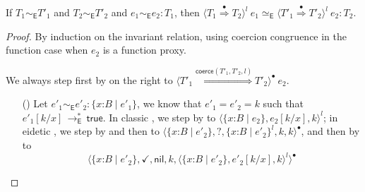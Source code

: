 \documentclass[9pt]{extarticle}
\newcommand{\ottnt}[1]{\mathit{#1}}
\newcommand{\ottsym}[1]{#1}
\begin{document}
\begin{lemma}
  \label{lem:eideticlrcast}
  If $ \ottnt{T_{{\mathrm{1}}}}   \sim _{  \mathsf{E}  }  \ottnt{T'_{{\mathrm{1}}}} $ and $ \ottnt{T_{{\mathrm{2}}}}   \sim _{  \mathsf{E}  }  \ottnt{T'_{{\mathrm{2}}}} $ and $ \ottnt{e_{{\mathrm{1}}}}   \sim _{  \mathsf{E}  }  \ottnt{e_{{\mathrm{2}}}}  :  \ottnt{T_{{\mathrm{1}}}} $, then
  $  \langle  \ottnt{T_{{\mathrm{1}}}}  \mathord{ \overset{\bullet}{\Rightarrow} }  \ottnt{T_{{\mathrm{2}}}}  \rangle^{ \ottnt{l} } ~  \ottnt{e_{{\mathrm{1}}}}    \simeq _{  \mathsf{E}  }   \langle  \ottnt{T'_{{\mathrm{1}}}}  \mathord{ \overset{\bullet}{\Rightarrow} }  \ottnt{T'_{{\mathrm{2}}}}  \rangle^{ \ottnt{l} } ~  \ottnt{e_{{\mathrm{2}}}}   :  \ottnt{T_{{\mathrm{2}}}} $.
\begin{proof}
    By induction on the invariant relation, using coercion congruence
    in the function case when $\ottnt{e_{{\mathrm{2}}}}$ is a function proxy.
{\iffull We always step first by  on the right to
      $ \langle  \ottnt{T'_{{\mathrm{1}}}}  \mathord{ \overset{  \mathsf{coerce} ( \ottnt{T'_{{\mathrm{1}}}} , \ottnt{T'_{{\mathrm{2}}}} , \ottnt{l} )  }{\Rightarrow} }  \ottnt{T'_{{\mathrm{2}}}}  \rangle^{\bullet} ~  \ottnt{e_{{\mathrm{2}}}} $.
\begin{itemize}
    \item[(\A{Refine})] Let $ \ottnt{e'_{{\mathrm{1}}}}   \sim _{  \mathsf{E}  }  \ottnt{e'_{{\mathrm{2}}}}  :   \{ \mathit{x} \mathord{:} \ottnt{B} \mathrel{\mid} \ottnt{e'_{{\mathrm{1}}}} \}  $, we
      know that $\ottnt{e'_{{\mathrm{1}}}}  \ottsym{=}  \ottnt{e'_{{\mathrm{2}}}} = \ottnt{k}$ such that $ \ottnt{e'_{{\mathrm{1}}}}  [  \ottnt{k} / \mathit{x}  ]  \,  \longrightarrow ^{*}_{  \mathsf{E}  }  \,  \mathsf{true} $.
In classic \lambdah, we step by  to
      $ \langle   \{ \mathit{x} \mathord{:} \ottnt{B} \mathrel{\mid} \ottnt{e_{{\mathrm{2}}}} \}  ,   \ottnt{e_{{\mathrm{2}}}}  [  \ottnt{k} / \mathit{x}  ]  ,  \ottnt{k}  \rangle^{ \ottnt{l} } $; in eidetic \lambdah, we step by
       and then  to
      $ \langle   \{ \mathit{x} \mathord{:} \ottnt{B} \mathrel{\mid} \ottnt{e'_{{\mathrm{2}}}} \}  ,   \mathord{?}  ,   \{ \mathit{x} \mathord{:} \ottnt{B} \mathrel{\mid} \ottnt{e'_{{\mathrm{2}}}} \}^{ \ottnt{l} }  ,  \ottnt{k} ,  \ottnt{k}  \rangle^{\bullet} $, and then by  to 
      \[  \langle   \{ \mathit{x} \mathord{:} \ottnt{B} \mathrel{\mid} \ottnt{e'_{{\mathrm{2}}}} \}  ,   \mathord{\checkmark}  ,  \mathsf{nil} ,  \ottnt{k} ,   \langle   \{ \mathit{x} \mathord{:} \ottnt{B} \mathrel{\mid} \ottnt{e'_{{\mathrm{2}}}} \}  ,   \ottnt{e'_{{\mathrm{2}}}}  [  \ottnt{k} / \mathit{x}  ]  ,  \ottnt{k}  \rangle^{ \ottnt{l} }   \rangle^{\bullet}  \]

\end{itemize}}
\end{proof}
\end{lemma}
\end{document}
